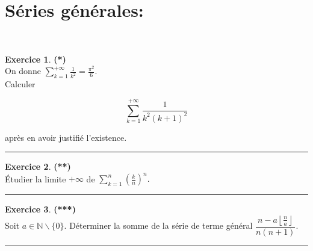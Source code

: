 \documentclass[a4paper,11pt]{article}
\theoremstyle{definition}
\newtheorem{exo}{Exercice} %
\newcommand{\disp}{\displaystyle}
\begin{document}
\section*{Séries générales:}\hfill\\%

\begin{minipage}{1\linewidth}\begin{minipage}[t]{0.48\linewidth}\raggedright

		
		
	\begin{exo}\textbf{(*)}\quad\\[0.2cm]
		On donne $\disp \sum_{k=1}^{+\infty} \frac{1}{k^{2}}=\frac{\pi^{2}}{6}$.\\
	 Calculer
		
		$$
		\sum_{k=1}^{+\infty} \frac{1}{k^{2}(k+1)^{2}}
		$$
		
		après en avoir justifié l'existence.
		
		\centering\rule{1\linewidth}{0.6pt}\end{exo}
		
		
		
	\end{minipage}\hfill\vrule\hfill\begin{minipage}[t]{0.48\linewidth}\raggedright
				
		\begin{exo}\textbf{(**)}\quad\\[0.2cm]
			
			Étudier la limite $+\infty$ de $\disp\sum_{k=1}^{n}\left(\frac{k}{n}\right)^{n} .
			$
			
			\centering\rule{1\linewidth}{0.6pt}\end{exo}
		
			\begin{exo}\textbf{(***)}\quad\\[0.2cm]
			Soit $a \in \mathbb{N} \backslash\{0\}$. Déterminer la somme de la série de terme général $\disp \dfrac{n-a\left\lfloor\frac{n}{a}\right\rfloor}{n(n+1)}$.
		
			\centering\rule{1\linewidth}{0.6pt}\end{exo}
		
		
		

		
		
\end{minipage}\end{minipage} \newpage
\end{document}
